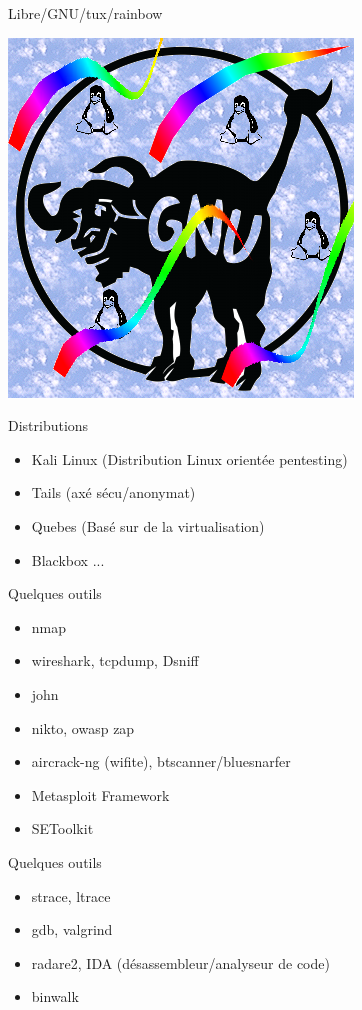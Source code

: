 \documentclass{beamer}
\begin{document}
\begin{frame}{Libre/GNU/tux/rainbow}
	\centerline{\includegraphics[scale=0.6]{libre1.png}}
\end{frame}

\begin{frame}{Distributions}
	\begin{itemize}
		\item Kali Linux (Distribution Linux orientée pentesting)
		
		\item Tails (axé sécu/anonymat)
		
		\item Quebes (Basé sur de la virtualisation)
		
		\item Blackbox ...
	\end{itemize}
\end{frame}

\begin{frame}{Quelques outils}
	\begin{itemize}
		\item nmap
		\item wireshark, tcpdump, Dsniff
		\item john
		\item nikto, owasp zap
		\item aircrack-ng (wifite), btscanner/bluesnarfer
		\item Metasploit Framework
		\item SEToolkit
	\end{itemize}
\end{frame}

\begin{frame}{Quelques outils}
	\begin{itemize}
		\item strace, ltrace
		\item gdb, valgrind
		\item radare2, IDA (désassembleur/analyseur de code)
		\item binwalk
	\end{itemize}
\end{frame}
\end{document}

